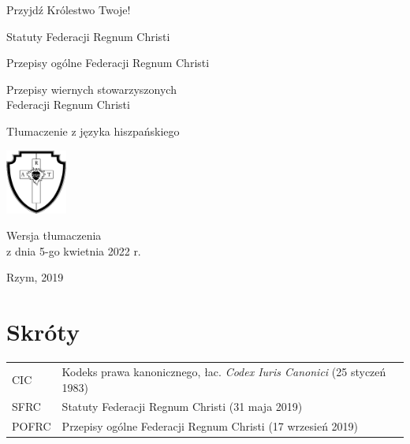 \documentclass{book}
\begin{document}
\pagestyle{plain}

\begin{titlepage}
\begin{center}

Przyjdź Królestwo Twoje!

\vspace*{4cm}

{\LARGE Statuty Federacji Regnum Christi}

{\LARGE Przepisy ogólne Federacji Regnum Christi}

{\LARGE Przepisy wiernych stowarzyszonych\\Federacji Regnum Christi}


Tłumaczenie z języka hiszpańskiego
            
\vspace*{1cm}

\includegraphics[width=2cm]{rc-logo-bw-712-755}

\vspace*{1cm}

Wersja tłumaczenia\\
z dnia 5-go kwietnia 2022 r.

\vfill

Rzym, 2019
            
\end{center}
\end{titlepage}


\cleardoublepage

\tableofcontents
\cleardoublepage


\section*{Skróty}

\begin{tabular}{lp{}}

CIC & Kodeks prawa kanonicznego, łac. {\em Codex Iuris Canonici} (25 styczeń 1983) \\
SFRC & Statuty Federacji Regnum Christi (31 maja 2019) \\
POFRC & Przepisy ogólne Federacji Regnum Christi (17 wrzesień 2019)

\end{tabular}
\end{document}
